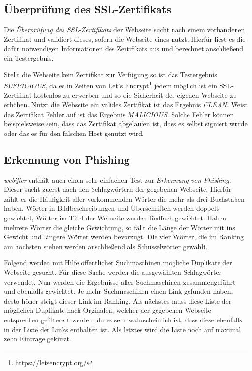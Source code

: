 \subsection{Überprüfung des SSL-Zertifikats}

Die \textit{Überprüfung des SSL-Zertifikats} der Webseite sucht nach einem vorhandenen Zertifikat
und validiert dieses, sofern die Webseite eines nutzt. Hierfür liest es die dafür notwendigen
Informationen des Zertifikats aus und berechnet anschließend ein Testergebnis.

Stellt die Webseite kein Zertifikat zur Verfügung so ist das Testergebnis \textit{SUSPICIOUS}, da
es in Zeiten von Let's Encrypt\footnote{\url{https://letsencrypt.org/}} jedem möglich ist ein
\acs{SSL}-Zertifikat kostenlos zu erwerben und so die Sicherheit der eigenen Webseite zu erhöhen.
Nutzt die Webseite ein valides Zertifikat ist das Ergebnis \textit{CLEAN}. Weist das Zertifikat
Fehler auf ist das Ergebnis \textit{MALICIOUS}. Solche Fehler können beispielsweise sein, dass das
Zertifikat abgelaufen ist, dass es selbst signiert wurde oder das es für den falschen Host genutzt
wird.

\subsection{Erkennung von Phishing}

\textit{webifier} enthält auch einen sehr einfachen Test zur \textit{Erkennung von Phishing}. Dieser
sucht zuerst nach den Schlagwörtern der gegebenen Webseite. Hierfür zählt er die Häufigkeit aller
vorkommenden Wörter die mehr als drei Buchstaben haben. Wörter in Bildbeschreibungen und
Überschriften werden doppelt gewichtet, Wörter im Titel der Webseite werden fünffach gewichtet.
Haben mehrere Wörter die gleiche Gewichtung, so fällt die Länge der Wörter mit ins Gewicht und
längere Wörter werden bevorzugt. Die vier Wörter, die im Ranking am höchsten stehen werden
anschließend als Schüsselwörter gewählt.

Folgend werden mit Hilfe öffentlicher Suchmaschinen mögliche Duplikate der Webseite gesucht.
Für diese Suche werden die ausgewählten Schlagwörter verwendet. Nun werden die Ergebnisse aller
Suchmaschinen zusammengeführt und ebenfalls gewichtet. Je mehr Suchmaschinen einen Link gefunden
haben, desto höher steigt dieser Link im Ranking. Als nächstes muss diese Liste der möglichen
Duplikate nach Orginalen, welcher der gegebenen Webseite entsprechen gefilterert werden, da es sehr
wahrscheinlich ist, dass diese ebenfalls in der Liste der Links enthalten ist. Als letztes wird die
Liste noch auf maximal zehn Eintrage gekürzt.

